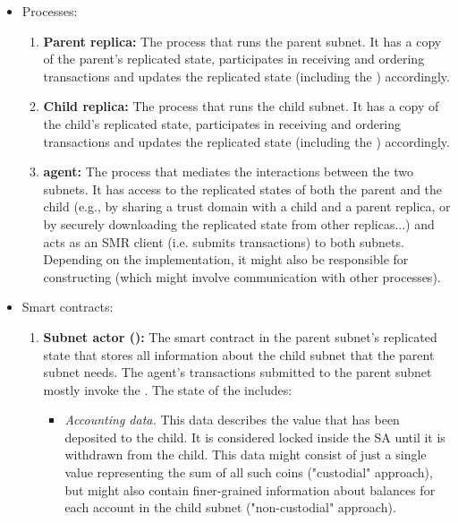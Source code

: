 \begin{itemize}
    \item Processes:
        \begin{enumerate}
            \item \textbf{Parent replica:} The process that runs the parent subnet. It has a copy of the parent's replicated state, participates in receiving and ordering transactions and updates the replicated state (including the \sa \dapp) accordingly.
            \item \textbf{Child replica:} The process that runs the child subnet. It has a copy of the child's replicated state, participates in receiving and ordering transactions and updates the replicated state (including the \gw \dapp) accordingly.
            \item \textbf{\ipc agent:} The process that mediates the interactions between the two subnets.
            It has access to the replicated states of both the parent and the child
            (e.g., by sharing a trust domain with a child and a parent replica, or by securely downloading the replicated state from other replicas...)
            and acts as an SMR client (i.e. submits transactions) to both subnets.
            Depending on the implementation, it might also be responsible for constructing \pofsFull (which might involve communication with other processes).
        \end{enumerate}
    \item Smart contracts:
        \begin{enumerate}
            \item \textbf{Subnet actor (\sa):} The smart contract in the parent subnet's replicated state
            that stores all information about the child subnet that the parent subnet needs.
            The \ipc agent's transactions submitted to the parent subnet mostly invoke the \sa.
            The state of the \sa includes:
            \begin{itemize}
            \item \emph{Accounting data.}
            This data describes the value that has been deposited to the child.
            It is considered locked inside the SA until it is withdrawn from the child.
            This data might consist of just a single value representing the sum of all such coins ("custodial" approach),
            but might also contain finer-grained information about balances for each account in the child subnet ("non-custodial" approach).

\end{itemize}
\end{enumerate}
\end{itemize}
